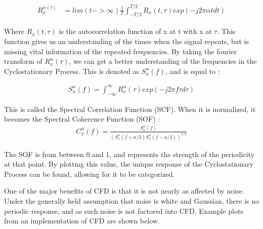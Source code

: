 \begin{align}\label{eq:caf}
    R_x^{\alpha(\tau)} &= lim(t->\infty) \frac{1}{T} \int_{-T/2}^{T/2} R_x(t,\tau)exp(-j2\pi\alpha t dt)
\end{align}

Where $R_x(t,\tau)$ is the autocorrelation function of x at t with x at $\tau$. This function gives us an understanding of the times when the signal repeats, but is missing vital information of the repeated frequencies. By taking the fourier transform of $R_x^\alpha(\tau)$, we can get a better understanding of the frequencies in the Cyclostationary Process. This is denoted as $S_x^\alpha(f)$, and is equal to \cite{cyclostat_text}:  \par

\begin{align}\label{eq:scf}
S_x^\alpha(f)=\int_{-\infty}^{\infty} R_x^\alpha(\tau)exp(-j2\pi f\tau d\tau) 
\end{align}
\par

This is called the Spectral Correlation Function (SCF). When it is normalized, it becomes the Spectral Coherence Function (SOF) \cite{cyclostat_text}:
\begin{align}\label{eq:caf}
C_x^\alpha(f) = \frac{ S_x^\alpha(f)}{ (S_x^\alpha(f+\alpha/2) S_x^\alpha(f-\alpha/2))^{1/2}}
\end{align}\par
The SOF is from between 0 and 1, and represents the strength of the periodicity at that point. By plotting this value, the unique response of the Cyclostationary Process can be found, allowing for it to be categorized.\par

One of the major benefits of CFD is that it is not nearly as affected by noise. Under the generally held assumption that noise is white and Gaussian, there is no periodic response, and as such noise is not factored into CFD. Example plots from an implementation of CFD are shown below. \par


